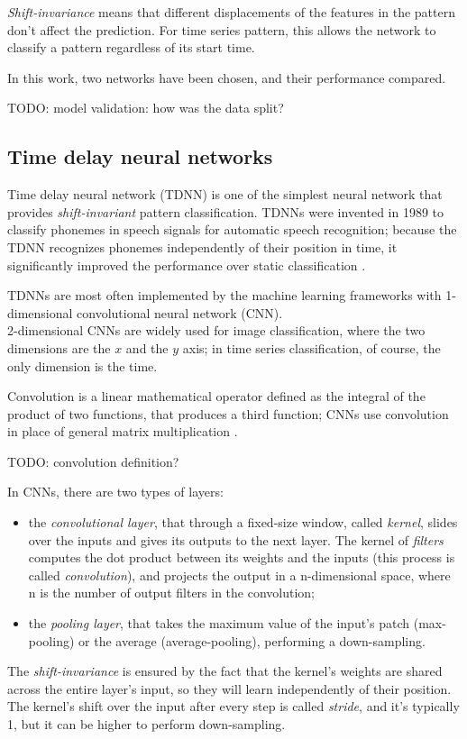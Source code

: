 \textit{Shift-invariance} means that different displacements of the features in the pattern don't affect the prediction. For time series pattern, this allows the network to classify a pattern regardless of its start time.
\bigbreak

In this work, two networks have been chosen, and their performance compared.
\bigbreak

TODO: model validation: how was the data split? 

\subsection{Time delay neural networks}
Time delay neural network (TDNN) is one of the simplest neural network that provides \textit{shift-invariant} pattern classification. TDNNs were invented in 1989 to classify phonemes in speech signals for automatic speech recognition; because the TDNN recognizes phonemes independently of their position in time, it significantly improved the performance over static classification \cite{Wai89}.
\bigbreak

TDNNs are most often implemented by the machine learning frameworks with 1-dimensional convolutional neural network (CNN).\\
2-dimensional CNNs are widely used for image classification, where the two dimensions are the $x$ and the $y$ axis; in time series classification, of course, the only dimension is the time.
\bigbreak

Convolution is a linear mathematical operator defined as the integral of the product of two functions, that produces a third function; CNNs use convolution in place of general matrix multiplication \cite{Goo16}.
\bigbreak

TODO: convolution definition?
\bigbreak

In CNNs, there are two types of layers:
\begin{itemize}
	\item the \textit{convolutional layer}, that through a fixed-size window, called \textit{kernel}, slides over the inputs and gives its outputs to the next layer. The kernel of \textit{filters} computes the dot product between its weights and the inputs (this process is called \textit{convolution}), and projects the output in a n-dimensional space, where n is the number of output filters in the convolution;
	\item the \textit{pooling layer}, that takes the maximum value of the input's patch (max-pooling) or the average (average-pooling), performing a down-sampling.
\end{itemize} 
The \textit{shift-invariance} is ensured by the fact that the kernel's weights are shared across the entire layer's input, so they will learn independently of their position. The kernel's shift over the input after every step is called \textit{stride}, and it's typically 1, but it can be higher to perform down-sampling.
\bigbreak

